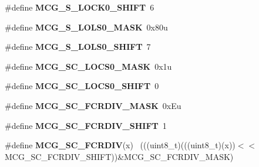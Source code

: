 \begin{DoxyCompactItemize}
\item 
\hypertarget{group___m_c_g___register___masks_ga5022e367019ecb07d0afbc3279e60b02}{}\#define {\bfseries M\+C\+G\+\_\+\+S\+\_\+\+L\+O\+C\+K0\+\_\+\+S\+H\+I\+F\+T}~6\label{group___m_c_g___register___masks_ga5022e367019ecb07d0afbc3279e60b02}

\item 
\hypertarget{group___m_c_g___register___masks_gae5967720d747b4d6f9fa748c94570c6d}{}\#define {\bfseries M\+C\+G\+\_\+\+S\+\_\+\+L\+O\+L\+S0\+\_\+\+M\+A\+S\+K}~0x80u\label{group___m_c_g___register___masks_gae5967720d747b4d6f9fa748c94570c6d}

\item 
\hypertarget{group___m_c_g___register___masks_ga5cddd795823b73d50830e628cee24644}{}\#define {\bfseries M\+C\+G\+\_\+\+S\+\_\+\+L\+O\+L\+S0\+\_\+\+S\+H\+I\+F\+T}~7\label{group___m_c_g___register___masks_ga5cddd795823b73d50830e628cee24644}

\item 
\hypertarget{group___m_c_g___register___masks_ga9a57acb821c7622eb2b25e6c7daf7e16}{}\#define {\bfseries M\+C\+G\+\_\+\+S\+C\+\_\+\+L\+O\+C\+S0\+\_\+\+M\+A\+S\+K}~0x1u\label{group___m_c_g___register___masks_ga9a57acb821c7622eb2b25e6c7daf7e16}

\item 
\hypertarget{group___m_c_g___register___masks_ga2a80b0f354602d5da8426e9d2b51ea12}{}\#define {\bfseries M\+C\+G\+\_\+\+S\+C\+\_\+\+L\+O\+C\+S0\+\_\+\+S\+H\+I\+F\+T}~0\label{group___m_c_g___register___masks_ga2a80b0f354602d5da8426e9d2b51ea12}

\item 
\hypertarget{group___m_c_g___register___masks_ga9b5d58f2f0a68eabe93f088dc2f81d2b}{}\#define {\bfseries M\+C\+G\+\_\+\+S\+C\+\_\+\+F\+C\+R\+D\+I\+V\+\_\+\+M\+A\+S\+K}~0x\+Eu\label{group___m_c_g___register___masks_ga9b5d58f2f0a68eabe93f088dc2f81d2b}

\item 
\hypertarget{group___m_c_g___register___masks_gacc99cc05a01e5807395bfe11518b26e3}{}\#define {\bfseries M\+C\+G\+\_\+\+S\+C\+\_\+\+F\+C\+R\+D\+I\+V\+\_\+\+S\+H\+I\+F\+T}~1\label{group___m_c_g___register___masks_gacc99cc05a01e5807395bfe11518b26e3}

\item 
\hypertarget{group___m_c_g___register___masks_gad48d91070247c5d3fab173623ed5ac3d}{}\#define {\bfseries M\+C\+G\+\_\+\+S\+C\+\_\+\+F\+C\+R\+D\+I\+V}(x)                                              ~(((uint8\+\_\+t)(((uint8\+\_\+t)(x))$<$$<$M\+C\+G\+\_\+\+S\+C\+\_\+\+F\+C\+R\+D\+I\+V\+\_\+\+S\+H\+I\+F\+T))\&M\+C\+G\+\_\+\+S\+C\+\_\+\+F\+C\+R\+D\+I\+V\+\_\+\+M\+A\+S\+K)\label{group___m_c_g___register___masks_gad48d91070247c5d3fab173623ed5ac3d}


\end{DoxyCompactItemize}
